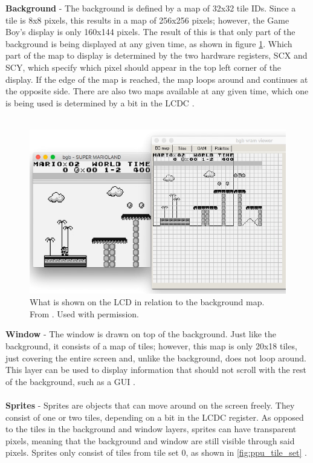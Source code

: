 \textbf{Background} - 
The background is defined by a map of 32x32 tile IDs. Since a tile is 8x8 pixels, this results in a map of 256x256 pixels; however, the Game Boy's display is only 160x144 pixels. The result of this is that only part of the background is being displayed at any given time, as shown in figure \ref{fig:ppu_viewport}. Which part of the map to display is determined by the two hardware registers, SCX and SCY, which specify which pixel should appear in the top left corner of the display. If the edge of the map is reached, the map loops around and continues at the opposite side. There are also two maps available at any given time, which one is being used is determined by a bit in the LCDC \cite{pandocsVideo}.\\
\\
\begin{figure}[H]
    \centering
    \includegraphics[width=\linewidth]{figures/PPU/PPU_viewport.png}
    \caption{What is shown on the LCD in relation to the background map. From \cite{ultimateGBtalkSlides}. Used with permission.}
    \label{fig:ppu_viewport}
\end{figure}
\textbf{Window} - 
The window is drawn on top of the background. Just like the background, it consists of a map of tiles; however, this map is only 20x18 tiles, just covering the entire screen and, unlike the background, does not loop around. This layer can be used to display information that should not scroll with the rest of the background, such as a GUI \cite{pandocsVideo}.\\
\\
\textbf{Sprites} - 
Sprites are objects that can move around on the screen freely. They consist of one or two tiles, depending on a bit in the LCDC register. As opposed to the tiles in the background and window layers, sprites can have transparent pixels, meaning that the background and window are still visible through said pixels. Sprites only consist of tiles from tile set 0, as shown in \ref{fig:ppu_tile_set} \cite{pandocsVideo}.\\
